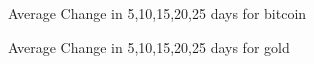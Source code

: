 \documentclass[12pt,a4paper]{article}
\begin{document}
\begin{figure}[H]
	\caption{ Average Change in 5,10,15,20,25 days for bitcoin}
	\label{figure:bitcoin_ac}
\end{figure}

\begin{figure}[H]
	\caption{ Average Change in 5,10,15,20,25 days for gold }
	\label{figure:gold_ac}
\end{figure}
\end{document}
